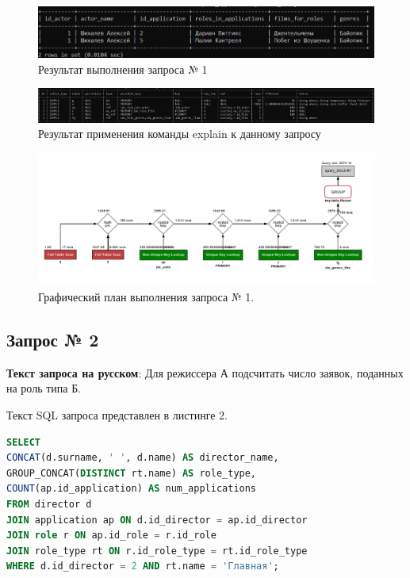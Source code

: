 \documentclass[11pt,a4paper,final]{article} %
\begin{document}
	\begin{figure}[H]
	\centering
	\includegraphics[width=1.0\linewidth]{1.png}
	\caption{Результат выполнения запроса № 1}
	\label{fig:1}
\end{figure}

\begin{figure}[H]
	\centering
	\includegraphics[width=1.0\linewidth]{e1.png}
	\caption{Результат применения команды explain к данному запросу}
	\label{fig:e1}
\end{figure}

\begin{figure}[H]
	\centering
	\includegraphics[width=1.0\linewidth]{ex1.png}
	\caption{Графический план выполнения запроса № 1.}
	\label{fig:ex1}
\end{figure}

\subsection{Запрос № 2}

\par \textbf{Текст запроса на русском}: Для режиссера А подсчитать число заявок, поданных на роль типа Б. 
\par Текст SQL запроса представлен в листинге 2.

\begin{lstlisting}[caption=SQL запрос № 2, language=SQL]
SELECT
CONCAT(d.surname, ' ', d.name) AS director_name,
GROUP_CONCAT(DISTINCT rt.name) AS role_type,
COUNT(ap.id_application) AS num_applications 
FROM director d
JOIN application ap ON d.id_director = ap.id_director
JOIN role r ON ap.id_role = r.id_role
JOIN role_type rt ON r.id_role_type = rt.id_role_type 
WHERE d.id_director = 2 AND rt.name = 'Главная';
\end{lstlisting}
\end{document}
